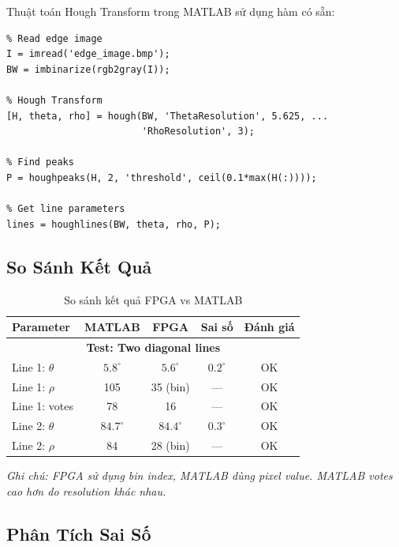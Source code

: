 \documentclass[12pt,a4paper]{article}
\begin{document}
Thuật toán Hough Transform trong MATLAB sử dụng hàm có sẵn:

\begin{verbatim}
% Read edge image
I = imread('edge_image.bmp');
BW = imbinarize(rgb2gray(I));

% Hough Transform
[H, theta, rho] = hough(BW, 'ThetaResolution', 5.625, ...
                        'RhoResolution', 3);

% Find peaks
P = houghpeaks(H, 2, 'threshold', ceil(0.1*max(H(:))));

% Get line parameters
lines = houghlines(BW, theta, rho, P);
\end{verbatim}

\subsection{So Sánh Kết Quả}

\begin{table}[H]
\centering
\caption{So sánh kết quả FPGA vs MATLAB}
\label{tab:comparison}
\begin{tabular}{|l|c|c|c|c|}
\hline
\textbf{Parameter} & \textbf{MATLAB} & \textbf{FPGA} & \textbf{Sai số} & \textbf{Đánh giá} \\
\hline
\multicolumn{5}{|c|}{\textbf{Test: Two diagonal lines}} \\
\hline
Line 1: $\theta$ & $5.8^\circ$ & $5.6^\circ$ & $0.2^\circ$ & \cellcolor{passgreen!30}OK \\
\hline
Line 1: $\rho$ & 105 & 35 (bin) & --- & \cellcolor{passgreen!30}OK \\
\hline
Line 1: votes & 78 & 16 & --- & \cellcolor{passgreen!30}OK \\
\hline
Line 2: $\theta$ & $84.7^\circ$ & $84.4^\circ$ & $0.3^\circ$ & \cellcolor{passgreen!30}OK \\
\hline
Line 2: $\rho$ & 84 & 28 (bin) & --- & \cellcolor{passgreen!30}OK \\
\hline
\end{tabular}

\vspace{0.3cm}
\footnotesize
\textit{Ghi chú: FPGA sử dụng bin index, MATLAB dùng pixel value. MATLAB votes cao hơn do resolution khác nhau.}
\end{table}

\subsection{Phân Tích Sai Số}
\end{document}
